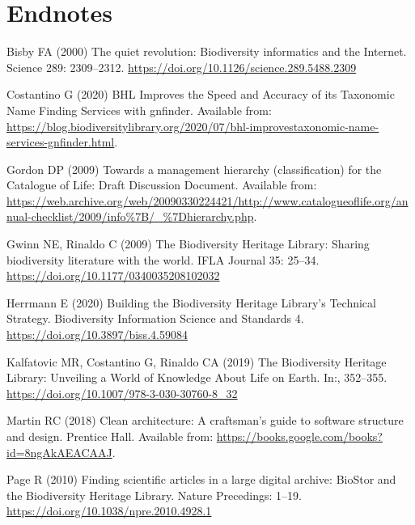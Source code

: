 \documentclass[
]{article}
\newlength{\cslhangindent}
\newlength{\cslentryspacingunit} %
\newenvironment{CSLReferences}[2] %
 {%
  \setlength{\parindent}{0pt}
  \ifodd #1
  \let\oldpar\par
  \def\par{\hangindent=\cslhangindent\oldpar}
  \fi
  \setlength{\parskip}{#2\cslentryspacingunit}
 }%
 {}
\begin{document}
\hypertarget{endnotes}{%
\section*{Endnotes}\label{endnotes}}

\hypertarget{refs}{}
\begin{CSLReferences}{1}{0}
\leavevmode{}%
Bisby FA (2000) {The quiet revolution: Biodiversity informatics and the
Internet}. Science 289: 2309--2312.
\url{https://doi.org/10.1126/science.289.5488.2309}

\leavevmode{}%
Costantino G (2020) {BHL Improves the Speed and Accuracy of its
Taxonomic Name Finding Services with gnfinder}. Available from:
\url{https://blog.biodiversitylibrary.org/2020/07/bhl-improvestaxonomic-name-services-gnfinder.html}.

\leavevmode{}%
Gordon DP (2009) {Towards a management hierarchy (classification) for
the Catalogue of Life: Draft Discussion Document}. Available from:
\url{https://web.archive.org/web/20090330224421/http://www.catalogueoflife.org/annual-checklist/2009/info\%7B/_\%7Dhierarchy.php}.

\leavevmode{}%
Gwinn NE, Rinaldo C (2009) {The Biodiversity Heritage Library: Sharing
biodiversity literature with the world}. IFLA Journal 35: 25--34.
\url{https://doi.org/10.1177/0340035208102032}

\leavevmode{}%
Herrmann E (2020) {Building the Biodiversity Heritage Library's
Technical Strategy}. Biodiversity Information Science and Standards 4.
\url{https://doi.org/10.3897/biss.4.59084}

\leavevmode{}%
Kalfatovic MR, Costantino G, Rinaldo CA (2019) {The Biodiversity
Heritage Library: Unveiling a World of Knowledge About Life on Earth}.
In:, 352--355. \url{https://doi.org/10.1007/978-3-030-30760-8_32}

\leavevmode{}%
Martin RC (2018) Clean architecture: A craftsman's guide to software
structure and design. Prentice Hall. Available from:
\url{https://books.google.com/books?id=8ngAkAEACAAJ}.

\leavevmode{}%
Page R (2010) {Finding scientific articles in a large digital archive:
BioStor and the Biodiversity Heritage Library}. Nature Precedings:
1--19. \url{https://doi.org/10.1038/npre.2010.4928.1}


\end{CSLReferences}
\end{document}
